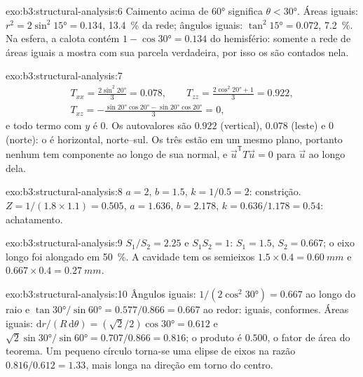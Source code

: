 \begin{solution}{exo:b3:structural-analysis:6}
Caimento acima de \ang{60} significa $\theta < \ang{30}$. Áreas iguais: $r^2 =
2\sin^2\ang{15} = 0.134$, \qty{13.4}{\percent} da rede; ângulos iguais:
$\tan^2\ang{15} = 0.072$, \qty{7.2}{\percent}. Na esfera, a calota contém
$1 - \cos\ang{30} = 0.134$ do hemisfério: somente a rede de áreas iguais a
mostra com sua parcela verdadeira, por isso os  são contados nela.
\end{solution}

\begin{solution}{exo:b3:structural-analysis:7}
\begin{gather*}
  T_{xx} = \frac{2\sin^2\ang{20}}3 = 0.078,\qquad
  T_{zz} = \frac{2\cos^2\ang{20} + 1}3 = 0.922,\\
  T_{xz} = -\frac{\sin\ang{20}\cos\ang{20} - \sin\ang{20}\cos\ang{20}}3 = 0,
\end{gather*}
e todo termo com $y$ é 0. Os autovalores são $0.922$ (vertical), $0.078$
(leste) e $0$ (norte): o  é horizontal, norte--sul. Os três 
estão em um mesmo plano, portanto nenhum tem componente ao longo de sua normal,
e $\vec u^{\mathsf T}T\vec u = 0$ para $\vec u$ ao longo dela.
\end{solution}

\begin{solution}{exo:b3:structural-analysis:8}
$a = 2$, $b = 1.5$, $k = 1/0.5 = 2$: constrição. $Z = 1/(1.8\times1.1) =
0.505$, $a = 1.636$, $b = 2.178$, $k = 0.636/1.178 = 0.54$: achatamento.
\end{solution}

\begin{solution}{exo:b3:structural-analysis:9}
$S_1/S_2 = 2.25$ e $S_1S_2 = 1$: $S_1 = 1.5$, $S_2 = 0.667$; o eixo longo
foi alongado em \qty{50}{\percent}. A cavidade tem os semieixos $1.5\times0.4 =
\qty{0.60}{mm}$ e $0.667\times0.4 = \qty{0.27}{mm}$.
\end{solution}

\begin{solution}{exo:b3:structural-analysis:10}
Ângulos iguais: $1/(2\cos^2\ang{30}) = 0.667$ ao longo do raio e
$\tan\ang{30}/\sin\ang{60} = 0.577/0.866 = 0.667$ ao redor: iguais, conformes.
Áreas iguais: $\mathrm dr/(R\,\mathrm d\theta) = (\sqrt2/2)\cos\ang{30} = 0.612$
e $\sqrt2\sin\ang{30}/\sin\ang{60} = 0.707/0.866 = 0.816$; o produto é
$0.500$, o fator de área do teorema. Um pequeno círculo torna-se uma elipse de
eixos na razão $0.816/0.612 = 1.33$, mais longa na direção em torno do centro.
\end{solution}

